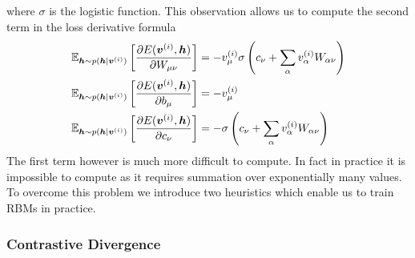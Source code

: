 \documentclass{myclass}
\begin{document}
where \(\sigma\) is the logistic function. This observation allows us to compute the second term in
the loss derivative formula
\[
\begin{split}
&\mathbb{E}_{\bm{h} \sim p(\bm{h} \mid \bm{v}^{(i)})}\left[ \pdv{E(\bm{v}^{(i)}, \bm{h})}{W_{\mu\nu}}\right] = -v_\mu^{(i)} \sigma\left(c_\nu + \sum_\alpha v_\alpha^{(i)} W_{\alpha\nu}\right)\\
&\mathbb{E}_{\bm{h} \sim p(\bm{h} \mid \bm{v}^{(i)})}\left[ \pdv{E(\bm{v}^{(i)}, \bm{h})}{b_{\mu}}\right] = -v_\mu^{(i)}\\
&\mathbb{E}_{\bm{h} \sim p(\bm{h} \mid \bm{v}^{(i)})}\left[ \pdv{E(\bm{v}^{(i)}, \bm{h})}{c_\nu}\right] = - \sigma\left(c_\nu + \sum_\alpha v_\alpha^{(i)} W_{\alpha\nu}\right)
\end{split}
\]
The first term however is much more difficult to compute. In fact in practice it is impossible to
compute as it requires summation over exponentially many values. To overcome this problem we
introduce two heuristics which enable us to train RBMs in practice.

\subsubsection{Contrastive Divergence}
\end{document}
